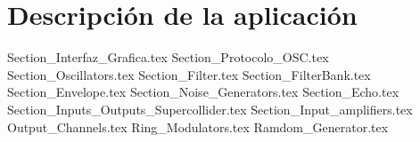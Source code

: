 \chapter{Descripción de la aplicación}

	{Section_Interfaz_Grafica.tex}
	{Section_Protocolo_OSC.tex}
	{Section_Oscillators.tex}
	{Section_Filter.tex}	
	{Section_FilterBank.tex}	
	{Section_Envelope.tex}	
	{Section_Noise_Generators.tex}
	{Section_Echo.tex}
	{Section_Inputs_Outputs_Supercollider.tex}
	{Section_Input_amplifiers.tex}
	{Output_Channels.tex}
	{Ring_Modulators.tex}
	{Ramdom_Generator.tex}